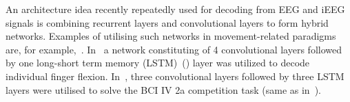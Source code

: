 An architecture idea recently repeatedly used for decoding from EEG and iEEG signals is combining recurrent layers and convolutional layers to form hybrid networks.
Examples of utilising such networks in movement-related paradigms are, for example,~\cite{xie-cnn-lstm-finger-movement, Zhang-2019}.
In~\cite{xie-cnn-lstm-finger-movement} a network constituting of 4 convolutional layers followed by one long-short term memory (LSTM)~(\cite{lstm-paper}) layer was utilized to decode individual finger flexion.
In~\cite{Zhang-2019}, three convolutional layers followed by three LSTM layers were utilised to solve the BCI IV 2a competition task (same as in~\cite{schirrmeister-deep-2017}).

